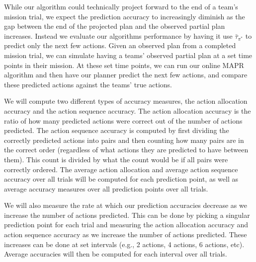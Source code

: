 While our algorithm could technically project forward to the end of a team's mission trial, we expect the prediction accuracy to increasingly diminish as the gap between the end of the projected plan and the observed partial plan increases. Instead we evaluate our algorithms performance by having it use $\bar{\tau}_{\pi^*}$ to predict only the next few actions. Given an observed plan from a completed mission trial, we can simulate having a teams' observed partial plan at a set time points in their mission. At these set time points, we can run our online MAPR algorithm and then have our planner predict the next few actions, and compare these predicted actions against the teams' true actions. 

We will compute two different types of accuracy measures, the action allocation accuracy and the action sequence accuracy. The action allocation accuracy is the ratio of how many predicted actions were correct out of the number of actions predicted. The action sequence accuracy is computed by first dividing the correctly predicted actions into pairs and then counting how many pairs are in the correct order (regardless of what actions they are predicted to have between them). This count is divided by what the count would be if all pairs were correctly ordered. The average action allocation and average action sequence accuracy over all trials will be computed for each prediction point, as well as average accuracy measures over all prediction points over all trials. 

We will also measure the rate at which our prediction accuracies decrease as we increase the number of actions predicted. This can be done by picking a singular prediction point for each trial and measuring the action allocation accuracy and action sequence accuracy as we increase the number of actions predicted. These increases can be done at set intervals (e.g., 2 actions, 4 actions, 6 actions, etc).  Average accuracies will then be computed for each interval over all trials. 